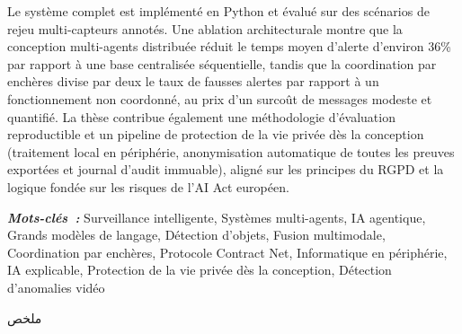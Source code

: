\documentclass[openany,12pt,oneside]{extreport}
\begin{document}
Le système complet est implémenté en Python et évalué sur des scénarios de rejeu multi-capteurs annotés. Une ablation architecturale montre que la conception multi-agents distribuée réduit le temps moyen d'alerte d'environ 36\% par rapport à une base centralisée séquentielle, tandis que la coordination par enchères divise par deux le taux de fausses alertes par rapport à un fonctionnement non coordonné, au prix d'un surcoût de messages modeste et quantifié. La thèse contribue également une méthodologie d'évaluation reproductible et un pipeline de protection de la vie privée dès la conception (traitement local en périphérie, anonymisation automatique de toutes les preuves exportées et journal d'audit immuable), aligné sur les principes du RGPD et la logique fondée sur les risques de l'AI Act européen.

\vskip 0.5cm
{\small \textbf{\textit{Mots-clés~:}} Surveillance intelligente, Systèmes multi-agents, IA agentique, Grands modèles de langage, Détection d'objets, Fusion multimodale, Coordination par enchères, Protocole Contract Net, Informatique en périphérie, IA explicable, Protection de la vie privée dès la conception, Détection d'anomalies vidéo}

\newpage
\vspace*{3cm}
\begin{center}
    {\Large\bf \begin{Arabic}ملخص\end{Arabic}}
\end{center} \vskip 1cm
\end{document}
